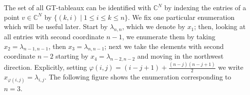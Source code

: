 \documentclass[11pt,fleqn]{article}
\newcommand\CC{\mathbb C}
\renewcommand\phi{\varphi}
\begin{document}
The set of all GT-tableaux can be identified with $\CC^N$ by indexing the 
entries of a point $v \in \CC^N$ by $\{(k,i) \mid 1 \leq i \leq k \leq n\}$. 
We fix one particular enumeration which will be useful later. Start by 
$\lambda_{n,n}$, which we denote by $x_1$; then, looking at all entries with 
second coordinate $n-1$, we enumerate them by taking $x_2 = 
\lambda_{n-1,n-1}$, then $x_3 = \lambda_{n,n-1}$; next we take the elements 
with second coordinate $n-2$ starting by $x_4 = \lambda_{n-2,n-2}$ and moving 
in the northwest direction. Explicitly, setting $\phi(i,j) = (i-j+1) + 
\frac{(n-j)(n-j+1)}{2}$ we write $x_{\phi(i,j)} = \lambda_{i,j}$. The 
following figure shows the enumeration corresponding to $n = 3$. 

\end{document}
